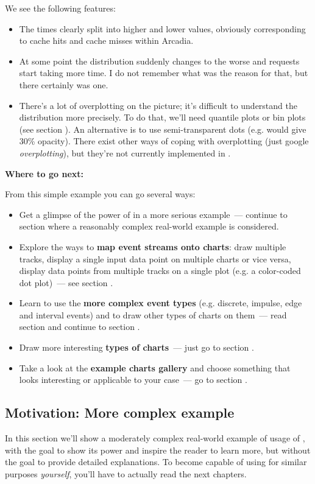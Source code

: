\documentclass{article}
\begin{document}
We see the following features:
\begin{itemize}
\item The times clearly split into higher and lower values, obviously corresponding to cache hits and cache misses within Arcadia.
\item At some point the distribution suddenly changes to the worse and requests start taking more time. I do not remember what was the reason for that, but there certainly was one.
\item There's a lot of overplotting on the picture; it's difficult to understand the distribution more precisely. To do that, we'll need quantile plots or bin plots (see section ). An alternative is to use semi-transparent dots (e.g.  would give 30\% opacity). There exist other ways of coping with overplotting (just google \emph{overplotting}), but they're not currently implemented in \timeplot{}.
\end{itemize}

\textbf{Where to go next:}

From this simple example you can go several ways:
\begin{itemize}
\item Get a glimpse of the power of \timeplot{} in a more serious example~--- continue to section  where a reasonably complex real-world example is considered.
\item Explore the ways to \textbf{map event streams onto charts}: draw multiple tracks, display a single input data point on multiple charts or vice versa, display data points from multiple tracks on a single plot (e.g. a color-coded dot plot)~--- see section .
\item Learn to use the \textbf{more complex event types} (e.g. discrete, impulse, edge and interval events) and to draw other types of charts on them~--- read section  and continue to section .
\item Draw more interesting \textbf{types of charts}~--- just go to section .
\item Take a look at the \textbf{example charts gallery} and choose something that looks interesting or applicable to your case~--- go to section .
\end{itemize}

\subsection{Motivation: More complex example}
\label{sec:tplot-motivation}
In this section we'll show a moderately complex real-world example of usage of \timeplot{}, with the goal to show its power and inspire the reader to learn more, but without the goal to provide detailed explanations. To become capable of using \timeplot{} for similar purposes \emph{yourself}, you'll have to actually read the next chapters.
\end{document}
